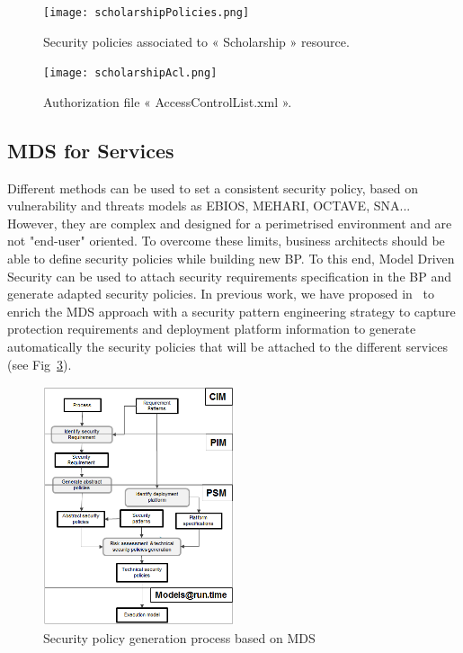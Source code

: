 \documentclass[runningheads,a4paper]{llncs}
\begin{document}
\begin{figure}  
\centering
\texttt{[image: scholarshipPolicies.png]}
\caption{Security policies associated to « Scholarship » resource.}
\label{fig:policy}
\end{figure}

 
\begin{figure}
\centering
\texttt{[image: scholarshipAcl.png]}
\caption{Authorization file « AccessControlList.xml ».}
\label{fig:acl}
\end{figure}


\subsection{MDS for Services}

Different methods can be used to set a consistent security policy, based on vulnerability and threats models as EBIOS, MEHARI, OCTAVE, SNA... However, they are complex and designed for a perimetrised environment and are not "end-user" oriented. To overcome these limits, business architects should be able to define security policies while building new BP. To this end, Model Driven Security can be used to attach security requirements specification in the BP and generate adapted security policies. In previous work, we have proposed in~\cite{OBG12} to enrich the MDS approach with a security pattern engineering strategy to capture protection requirements and deployment platform information to generate automatically the security policies that will be attached to the different services (see Fig~\ref{fig:mds}).

\begin{figure}  

\centering
\includegraphics[height=200pt, width=160pt]{mds.png}
\caption{Security policy generation process based on MDS}
\label{fig:mds}
\end{figure}
\end{document}
